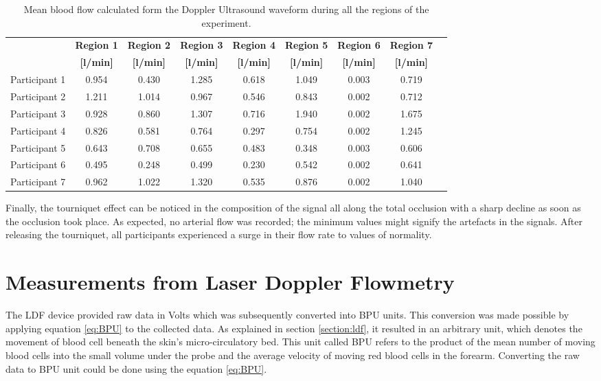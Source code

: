 \begin{table}[!htb]
	\caption[Mean blood flow calculated from the Doppler Ultrasound]{Mean blood flow calculated form the Doppler Ultrasound waveform during all the regions of the experiment.}
	\label{tbl:DU flow}
	\centering \small
	\begin{tabular}{p{1.9cm}cccccccc}
		\toprule
		& \textbf{Region 1}
		& \textbf{Region 2}
		& \textbf{Region 3}
		& \textbf{Region 4}
		& \textbf{Region 5}
		& \textbf{Region 6}
		& \textbf{Region 7} \\
		& \textbf{[\si[per-mode=symbol]{\litre\per\minute}]}
		& \textbf{[\si[per-mode=symbol]{\litre\per\minute}]}
		& \textbf{[\si[per-mode=symbol]{\litre\per\minute}]}
		& \textbf{[\si[per-mode=symbol]{\litre\per\minute}]}
		& \textbf{[\si[per-mode=symbol]{\litre\per\minute}]}
		& \textbf{[\si[per-mode=symbol]{\litre\per\minute}]}
		& \textbf{[\si[per-mode=symbol]{\litre\per\minute}]} \\\midrule	
		Participant 1 & 0.954 & 0.430 & 1.285 & 0.618 & 1.049 & 0.003 & 0.719 \\
		Participant 2 & 1.211 & 1.014 & 0.967 & 0.546 & 0.843 & 0.002 & 0.712 \\  
		Participant 3 & 0.928 & 0.860 & 1.307 & 0.716 & 1.940 & 0.002 & 1.675 \\  
		Participant 4 & 0.826 & 0.581 & 0.764 & 0.297 & 0.754 & 0.002 & 1.245 \\  
		Participant 5 & 0.643 & 0.708 & 0.655 & 0.483 & 0.348 & 0.003 & 0.606 \\  
		Participant 6 & 0.495 & 0.248 & 0.499 & 0.230 & 0.542 & 0.002 & 0.641 \\  
		Participant 7 & 0.962 & 1.022 & 1.320 & 0.535 & 0.876 & 0.002 & 1.040 \\  	
		\bottomrule
	\end{tabular}
\end{table}

Finally, the tourniquet effect can be noticed in the composition of the signal all along the total occlusion with a sharp decline as soon as the occlusion took place. As expected, no arterial flow was recorded; the minimum values might signify the artefacts in the signals. After releasing the tourniquet, all participants experienced a surge in their flow rate to values of normality. 

\section{Measurements from Laser Doppler Flowmetry}
\label{section comparison LDF}
The LDF device provided raw data in Volts which was subsequently converted into BPU units. This conversion was made possible by applying equation \ref{eq:BPU} to the collected data. As explained in section \ref{section:ldf}, it resulted in an arbitrary unit, which denotes the movement of blood cell beneath the skin's micro-circulatory bed. This unit called BPU refers to the product of the mean number of moving blood cells into the small volume under the probe and the average velocity of moving red blood cells in the forearm. Converting the raw data to BPU unit could be done using the equation \ref{eq:BPU}.


